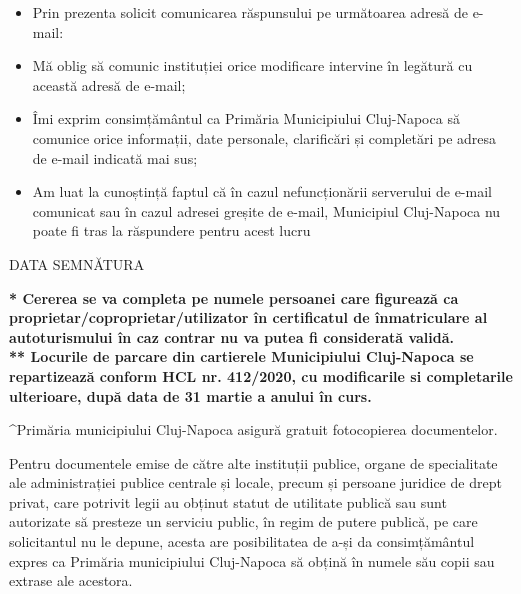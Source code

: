 \documentclass[11pt,a4paper]{article}
\newcommand{\fillline}[1][6cm]{\underline{\hspace{#1}}}
\newcommand{\checkboxempty}{$\square$}
\begin{document}
\vspace{0.3cm}

\begin{itemize}[leftmargin=*]
\item[\checkboxempty] Prin prezenta solicit comunicarea răspunsului pe următoarea adresă de e-mail:\\
\fillline[12cm]
\item[\checkboxempty] Mă oblig să comunic instituției orice modificare intervine în legătură cu această adresă de e-mail;
\item[\checkboxempty] Îmi exprim consimțământul ca Primăria Municipiului Cluj-Napoca să comunice orice informații, date personale, clarificări și completări pe adresa de e-mail indicată mai sus;
\item[\checkboxempty] Am luat la cunoștință faptul că în cazul nefuncționării serverului de e-mail comunicat sau în cazul adresei greșite de e-mail, Municipiul Cluj-Napoca nu poate fi tras la răspundere pentru acest lucru
\end{itemize}

\vspace{1cm}

DATA \fillline[5cm] \hfill SEMNĂTURA \fillline[5cm]

\vspace{0.5cm}

\textbf{* Cererea se va completa pe numele persoanei care figurează ca proprietar/coproprietar/utilizator în certificatul de înmatriculare al autoturismului în caz contrar nu va putea fi considerată validă.\\
** Locurile de parcare din cartierele Municipiului Cluj-Napoca se repartizează conform HCL nr. 412/2020, cu modificarile si completarile ulterioare, după data de 31 martie a anului în curs.}

\vspace{0.3cm}

\footnotesize
\textasciicircum{}Primăria municipiului Cluj-Napoca asigură gratuit fotocopierea documentelor.

Pentru documentele emise de către alte instituții publice, organe de specialitate ale administrației publice centrale și locale, precum și persoane juridice de drept privat, care potrivit legii au obținut statut de utilitate publică sau sunt autorizate să presteze un serviciu public, în regim de putere publică, pe care solicitantul nu le depune, acesta are posibilitatea de a-și da consimțământul expres ca Primăria municipiului Cluj-Napoca să obțină în numele său copii sau extrase ale acestora.
\end{document}
